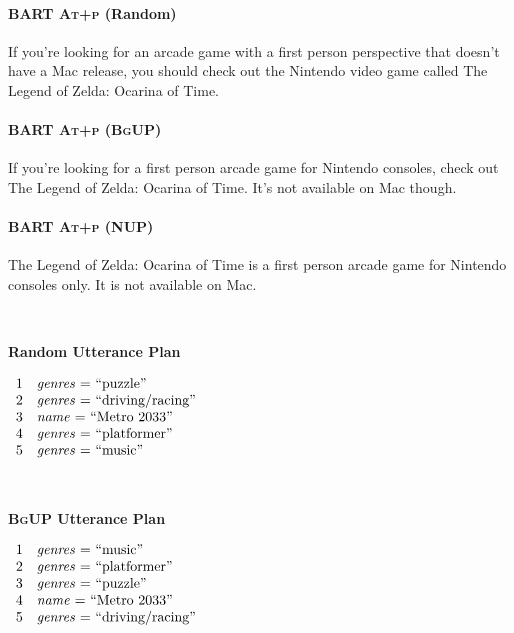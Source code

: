 \paragraph{BART \textsc{At+p} (Random)}
If you're looking for an arcade game with a first person perspective that doesn't have a Mac release, you should check out the Nintendo video game called The Legend of Zelda: Ocarina of Time.

\paragraph{BART \textsc{At+p (BgUP)}}
If you're looking for a first person arcade game for Nintendo consoles, check out The Legend of Zelda: Ocarina of Time. It's not available on Mac though.

\paragraph{BART \textsc{At+p} (NUP)}
The Legend of Zelda: Ocarina of Time is a first person arcade game for Nintendo consoles only. It is not available on Mac.


~\\

\clearpage

\noindent
\parbox{.333\textwidth}{\textbf{Random Utterance Plan}}
$\begin{array}{ll}
1  &  \textrm{\textit{genres} = ``puzzle''} \\
2  &  \textrm{\textit{genres} = ``driving/racing''} \\
3  &  \textrm{\textit{name} = ``Metro 2033''} \\
4  &  \textrm{\textit{genres} = ``platformer''} \\
5  &  \textrm{\textit{genres} = ``music''} \\
\end{array}$

~\\

\noindent
\parbox{.333\textwidth}{\textbf{\textsc{BgUP} Utterance Plan}}
$\begin{array}{ll}
1  &  \textrm{\textit{genres} = ``music''} \\
2  &  \textrm{\textit{genres} = ``platformer''} \\
3  &  \textrm{\textit{genres} = ``puzzle''} \\
4  &  \textrm{\textit{name} = ``Metro 2033''} \\
5  &  \textrm{\textit{genres} = ``driving/racing''} \\
\end{array}$

~\\


